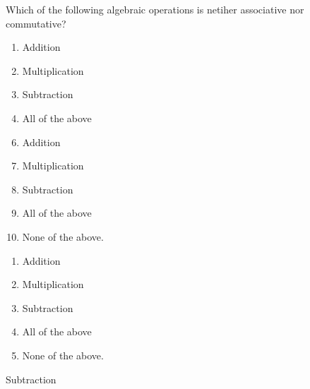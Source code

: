 


 Which of the following algebraic operations is netiher associative nor commutative?


\ifsat
	\begin{enumerate}[label=\Alph*)]
		\item   Addition
		\item  Multiplication
		\item  Subtraction%
		\item  All of the above
	\end{enumerate}
\else
\fi

\ifacteven
	\begin{enumerate}[label=\textbf{\Alph*.},itemsep=\fill,align=left]
		\setcounter{enumii}{5}
		\item   Addition
		\item  Multiplication
		\item  Subtraction%
		\addtocounter{enumii}{1}
		\item  All of the above
		\item  None of the above.
	\end{enumerate}
\else
\fi

\ifactodd
	\begin{enumerate}[label=\textbf{\Alph*.},itemsep=\fill,align=left]
		\item   Addition
		\item  Multiplication
		\item  Subtraction%
		\item  All of the above
		\item  None of the above.
	\end{enumerate}
\else
\fi

\ifgridin
  Subtraction%
		
\else
\fi

